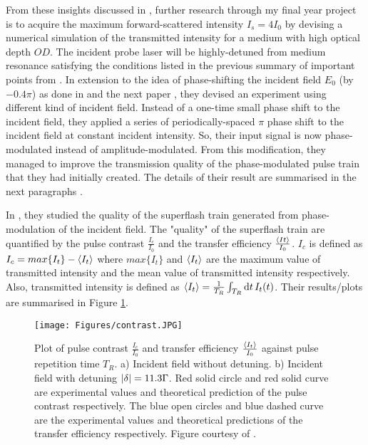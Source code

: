 From these insights discussed in , further research through my final year project is to acquire the maximum forward-scattered intensity $I_{s} = 4 I_{0}$ by devising a numerical simulation of the transmitted intensity for a medium with high optical depth $OD$. The incident probe laser will be highly-detuned from medium resonance satisfying the conditions listed in the previous summary of important points from . In extension to the idea of phase-shifting the incident field $E_{0}$ (by $-0.4\pi$) as done in  and the next paper , they devised an experiment using different kind of incident field. Instead of a one-time small phase shift to the incident field, they applied a series of periodically-spaced $\pi$ phase shift to the incident field at constant incident intensity. So, their input signal is now phase-modulated instead of amplitude-modulated. From this modification, they managed to improve the transmission quality of the phase-modulated pulse train that they had initially created. The details of their result are summarised in the next paragraphs \cite{Kwong2015}.

In , they studied the quality of the superflash train generated from phase-modulation of the incident field. The "quality" of the superflash train are quantified by the pulse contrast  $\frac{I_{c}}{I_{0}}$ and the transfer efficiency $\frac{\expval{I_{}t}}{I_{0}}$. $I_{c}$ is defined as $I_{c} = max\{I_{t}\} - \expval{I_{t}}$ where $max\{I_{t}\}$ and $\expval{I_{t}}$ are the maximum value of transmitted intensity and the mean value of transmitted intensity respectively. Also, transmitted intensity is defined as $\expval{I_{t}} = \frac{1}{T_{R}} \int_{T_{R}} \dd{t} I_{t}(t)$. Their results/plots are summarised in Figure \ref{fig: contrast}.

\begin{figure}
    \centering
    \texttt{[image: Figures/contrast.JPG]}
    \caption[Plot of Pulse Contrast and Transfer Efficiency As A Function of Repetition Time]{Plot of pulse contrast $\frac{I_{c}}{I_{0}}$ and transfer efficiency $\frac{\expval{I_{t}}}{I_{0}}$ against pulse repetition time $T_{R}$. a) Incident field without detuning. b) Incident field with detuning $\abs{\delta} = 11.3 \Gamma$. Red solid circle and red solid curve are experimental values and theoretical prediction of the pulse contrast respectively. The blue open circles and blue dashed curve are the experimental values and theoretical predictions of the transfer efficiency respectively. Figure courtesy of \protect{}.}
    \label{fig: contrast}
\end{figure}

